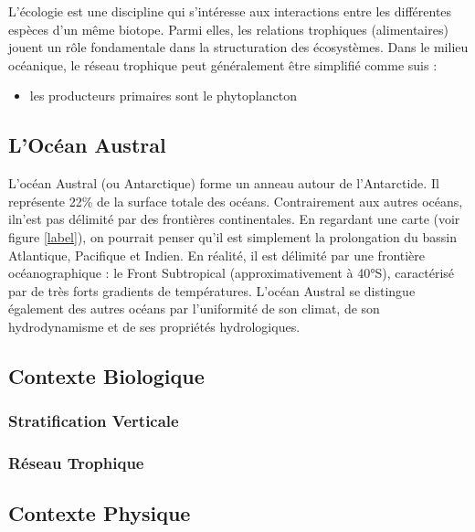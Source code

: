 \documentclass{article}
\begin{document}
	L'écologie est une discipline qui s'intéresse aux interactions entre les différentes espèces d'un même biotope. Parmi elles, les relations trophiques (alimentaires) jouent un rôle fondamentale dans la structuration des écosystèmes. Dans le milieu océanique, le réseau trophique peut généralement être simplifié comme suis : 
	\begin{itemize} 	
		\item les producteurs primaires sont le phytoplancton
	\end{itemize}
	
	
	
	\subsection{L'Océan Austral}
	L'océan Austral (ou Antarctique) forme un anneau autour de l'Antarctide. Il représente 22\% de la surface totale des océans. Contrairement aux autres océans, iln'est pas délimité par des frontières continentales. En regardant une carte (voir figure \ref{label}), on pourrait penser qu'il est simplement la prolongation du bassin Atlantique, Pacifique et Indien. En réalité, il est délimité par une frontière océanographique : le Front Subtropical (approximativement à 40°S), caractérisé par de très forts gradients de températures. L'océan Austral se distingue également des autres océans par l'uniformité de son climat, de son hydrodynamisme et de ses propriétés hydrologiques.
	
	
	\subsection{Contexte Biologique}
	\subsubsection{Stratification Verticale}
	\subsubsection{Réseau Trophique}
	
	
	\subsection{Contexte Physique}
	\subsubsection{}
	\clearpage
\end{document}
